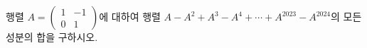 \hspace*{2mm}\begin{minipage}[t]{\dimexpr\linewidth-2mm\relax}\vspace{0pt}
행렬 $A=\begin{pmatrix} 1 & -1 \\ 0 & 1 \end{pmatrix}$에 대하여 행렬 $A-A^2+A^3-A^4+\cdots+A^{2023}-A^{2024}$의 모든 성분의 합을 구하시오.\end{minipage}
